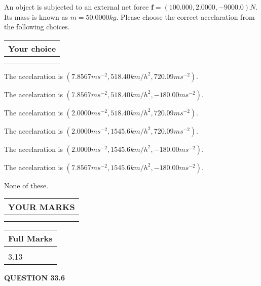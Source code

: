 \documentclass[12pt]{article}
\begin{document}
An object is subjected to an external net force $\mathbf{f}=(
100.000 ,
2.0000,
-9000.0  )N$. Its mass is known as
$m= %
50.0000  kg$. Please choose the correct accelaration
from the following choices.
 
  
  
\noindent\hspace{3.0in} \begin{tabular}{|l|}
\hline
Your choice \\
\hline
 \\ 
 \\ 
\hline
\end{tabular}
  
  
 
 
The accelaration is
$(
7.8567ms^{-2},
518.40km/h^2,
720.09ms^{-2}
).
$
 
 
The accelaration is
$(
7.8567ms^{-2},
518.40km/h^2,
-180.00ms^{-2}
).
$
 
 
The accelaration is
$(
2.0000ms^{-2},
518.40km/h^2,
720.09ms^{-2}
).
$
 
 
The accelaration is
$(
2.0000ms^{-2},
1545.6km/h^2,
720.09ms^{-2}
).
$
 
 
The accelaration is
$(
2.0000ms^{-2},
1545.6km/h^2,
-180.00ms^{-2}
).
$
 
 
The accelaration is
$(
7.8567ms^{-2},
1545.6km/h^2,
-180.00ms^{-2}
).
$
 
 
 None of these.
 
 
 
 

 
\vspace{0.3in}
  
\vspace{0.2in}
  
\noindent\begin{tabular}{|l|}
\hline
 YOUR MARKS  \\
\hline
 \\ 
 \\ 
\hline
\end{tabular}
\hspace{0.05in} \begin{tabular}{|l|}
\hline
 Full Marks  \\
\hline
 \\ 
3.13 \\
\hline
\end{tabular}
{\textbf{\Large{QUESTION
33.6 
}}}
  
\end{document}
